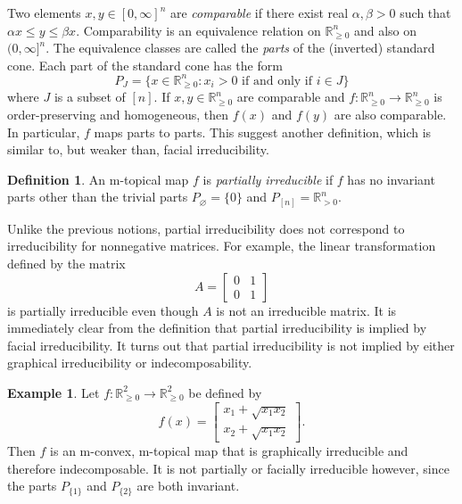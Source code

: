\documentclass[10pt,reqno]{amsart}
\newcommand{\R}{\mathbb{R}}
\newcommand{\sign}{\operatorname{sgn}}
\theoremstyle{plain}
\theoremstyle{definition}
\newtheorem{definition}[theorem]{Definition}
\newtheorem{example}[theorem]{Example}
\numberwithin{equation}{section}
\begin{document}
Two elements $x, y \in [0,\infty]^n$ are \emph{comparable} if there exist real $\alpha, \beta > 0$ such that $\alpha x \le y \le \beta x$.  Comparability is an equivalence relation on $\R^n_{\ge 0}$ and also on $(0,\infty]^n$. The equivalence classes are called the \emph{parts} of the (inverted) standard cone.  Each part of the standard cone has the form 
\begin{equation} \label{eq:part}
P_J = \{ x \in \R^n_{\ge 0} : x_i > 0 \text{ if and only if } i \in J \}
\end{equation}
where $J$ is a subset of $[n]$. If $x,y \in \R^n_{\ge 0}$ are comparable and $f: \R^n_{\ge 0} \rightarrow \R^n_{\ge 0}$ is order-preserving and homogeneous, then $f(x)$ and $f(y)$ are also comparable.  In particular, $f$ maps parts to parts. This suggest another definition, which is similar to, but weaker than, facial irreducibility. 
\begin{definition} \label{def:partial}
An m-topical map $f$ is \emph{partially irreducible} if $f$ has no invariant parts other than the trivial parts $P_\varnothing = \{0\}$ and $P_{[n]} = \R^n_{>0}$. %
\end{definition}
Unlike the previous notions, partial irreducibility does not correspond to irreducibility for nonnegative matrices.  For example, the linear transformation defined by the matrix 
$$A = \begin{bmatrix} 0 & 1 \\ 0 & 1 \end{bmatrix}$$ 
is partially irreducible even though $A$ is not an irreducible matrix.  It is immediately clear from the definition that partial irreducibility is implied by facial irreducibility.  It turns out that partial irreducibility is not implied by either graphical irreducibility or indecomposability.  

\begin{example}
Let $f:\R^2_{\ge 0} \rightarrow \R^2_{\ge 0}$ be defined by
$$f(x) = \begin{bmatrix} x_1 + \sqrt{x_1 x_2} \\ x_2 + \sqrt{x_1 x_2} \end{bmatrix}.$$
Then $f$ is an m-convex, m-topical map that is graphically irreducible and therefore indecomposable.  It is not partially or facially irreducible however, since the parts $P_{\{1\}}$ and $P_{\{2 \}}$ are both invariant.  
\end{example} 
\end{document}
